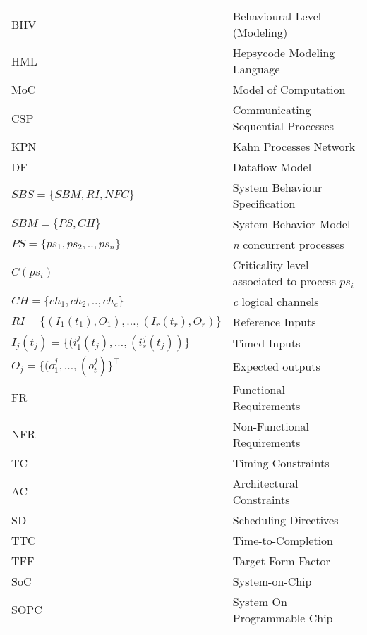 \begin{center}
\begin{longtable}{ll}
    BHV                                     & Behavioural Level (Modeling) \\
    HML                                     & Hepsycode Modeling Language \\
    MoC                                     & Model of Computation  \\
    CSP                                     & Communicating Sequential Processes \\
    KPN                                     & Kahn Processes Network \\
    DF                                      & Dataflow Model \\
    $SBS = \{SBM, RI, NFC\}$                & System Behaviour Specification \\
	$SBM = \{PS, CH\}$                      & System Behavior Model           \\ 
	$PS = \{ps_{1}, ps_{2}, .. , ps_{n}\}$  & \textit{n} concurrent processes \\
	$C(ps_{i})$                             & Criticality level associated to process $ps_{i}$ \\ 
	$CH = \{ch_{1}, ch_{2}, .. , ch_{c}\}$  & \textit{c} logical channels     \\
	\textbf{$RI = \{(I_{1}(t_1), O_{1}), {\dots}, (I_{r}(t_r), O_{r})\}$}    & Reference Inputs  \\
	$I_{j}(t_j) = \{(i^{j}_{1}(t_j), {\dots}, (i^{j}_{s}(t_j))\}^\intercal$  & Timed Inputs  \\
	$O_{j} = \{(o^{j}_{1}, {\dots}, (o^{j}_{t})\}^\intercal$  & Expected outputs  \\
	FR                                       & Functional Requirements \\
  NFR                                     & Non-Functional Requirements \\
	TC                                      & Timing Constraints \\
	AC                                      & Architectural Constraints \\
	SD                                      & Scheduling Directives \\ 
	TTC                                     & Time-to-Completion \\
	TFF                                     & Target Form Factor \\
	SoC                                     & System-on-Chip  \\
	SOPC                                    & System On Programmable Chip \\

\end{longtable}
\end{center}
